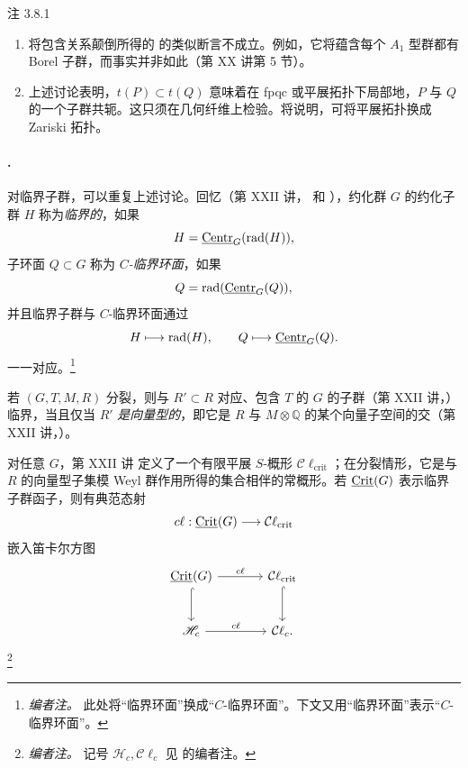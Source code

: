\begin{sgastatement}{注 3.8.1}
\begin{enumerate}[label=\textup{(\roman*)}]
\item 将包含关系颠倒所得的  的类似断言不成立。例如，它将蕴含每个 \(A_1\) 型群都有 Borel 子群，而事实并非如此（第 XX 讲第 5 节）。
\item 上述讨论表明，\(t(P)\subset t(Q)\) 意味着在 fpqc 或平展拓扑下局部地，\(P\) 与 \(Q\) 的一个子群共轭。这只须在几何纤维上检验。将说明，可将平展拓扑换成 Zariski 拓扑。
\end{enumerate}
\end{sgastatement}

\paragraph{.}
对临界子群，可以重复上述讨论。回忆（第 XXII 讲， 和 ），约化群 \(G\) 的约化子群 \(H\) 称为\emph{临界的}，如果
\[
 H=\underline{\operatorname{Centr}}_G(\operatorname{rad}(H)),
\]
子环面 \(Q\subset G\) 称为 \emph{\(C\)-临界环面}，如果
\[
 Q=\operatorname{rad}(\underline{\operatorname{Centr}}_G(Q)),
\]
并且临界子群与 \(C\)-临界环面通过
\[
 H\longmapsto\operatorname{rad}(H),
 \qquad
 Q\longmapsto\underline{\operatorname{Centr}}_G(Q).
\]
一一对应。\footnote{\emph{编者注。} 此处将“临界环面”换成“\(C\)-临界环面”。下文又用“临界环面”表示“\(C\)-临界环面”。}

若 \((G,T,M,R)\) 分裂，则与 \(R'\subset R\) 对应、包含 \(T\) 的 \(G\) 的子群（第 XXII 讲，）临界，当且仅当 \(R'\) \emph{是向量型的}，即它是 \(R\) 与 \(M\otimes\mathbb Q\) 的某个向量子空间的交（第 XXII 讲，）。

对任意 \(G\)，第 XXII 讲  定义了一个有限平展 \(S\)-概形 \(\mathcal C\ell_{\mathrm{crit}}\)；在分裂情形，它是与 \(R\) 的向量型子集模 Weyl 群作用所得的集合相伴的常概形。若 \(\underline{\operatorname{Crit}}(G)\) 表示临界子群函子，则有典范态射
\[
 c\ell:\underline{\operatorname{Crit}}(G)\longrightarrow\mathcal C\ell_{\mathrm{crit}}
\]
嵌入笛卡尔方图
\[
\begin{tikzcd}[column sep=large,row sep=large]
 \Crit(G) \arrow[r,"c\ell"] \arrow[d,hook]
   & \mathcal C\ell_{\mathrm{crit}} \arrow[d,hook]\\
  \mathscr H_c \arrow[r,"c\ell"]
   & \mathcal C\ell_c .
\end{tikzcd}
\]
\footnote{\emph{编者注。} 记号 \(\mathscr H_c,\mathcal C\ell_c\) 见  的编者注。}

